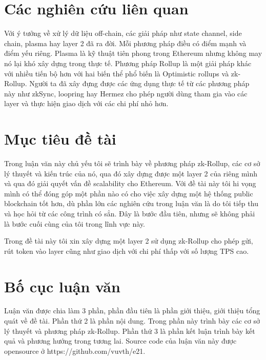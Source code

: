 \documentclass[../thesis.tex]{subfiles}
\begin{document}
\section{Các nghiên cứu liên quan}
Với ý tưởng về xử lý dữ liệu off-chain, các giải pháp như state channel, side chain, plasma hay layer 2 đã ra đời. Mỗi phương pháp điều có điểm mạnh và điểm yếu riêng. Plasma \cite{Plasma} là kỹ thuật tiên phong trong Ethereum nhưng không may nó lại khó xây dựng trong thực tế. Phương pháp Rollup là một giải pháp khác với nhiều tiến bộ hơn với hai biến thể phổ biến là Optimistic rollups và zk-Rollup. Người ta đã xây đựng được các ứng dụng thực tế từ các phương pháp này như zkSync, loopring hay Hermez cho phép người dùng tham gia vào các layer và thực hiện giao dịch với các chi phí nhỏ hơn.

\section{Mục tiêu đề tài}
Trong luận văn này chủ yếu tôi sẽ trình bày về phương pháp zk-Rollup, các cơ sở lý thuyết và kiến trúc của nó, qua đó xây dựng được một layer 2 của riêng mình và qua đó giải quyết vấn đề scalability cho Ethereum. Với đề tài này tôi hi vọng mình có thể đóng góp một phần nào có cho việc xây dựng một hệ thống public blockchain tốt hơn, dù phần lớn các nghiên cứu trong luận văn là do tôi tiếp thu và học hỏi từ các công trình có sẳn. Đây là bước đầu tiên, nhưng sẽ không phải là bước cuối cùng của tôi trong lĩnh vực này.

Trong đề tài này tôi xin xây dựng một layer 2 sử dụng zk-Rollup cho phép gửi, rút token vào layer cũng như giao dịch với chi phí thấp với số lượng TPS cao.

\section{Bố cục luận văn}
Luận văn được chia làm 3 phần, phần đầu tiên là phần giới thiệu, giới thiệu tổng quát về đề tài. Phần thứ 2 là phần nội dung. Trong phần này trình bày các cơ sở lý thuyết và phương pháp zk-Rollup. Phần thứ 3 là phần kết luận trình bày kết quả và phương hướng trong tương lai. Source code của luận văn này được opensource ở https://github.com/vuvth/e21.
\end{document}
